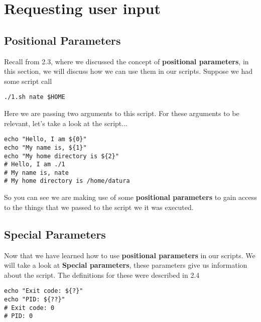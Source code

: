 \documentclass{report}
\begin{document}
  \pagebreak \bigbreak \noindent 
  \section{\LARGE Requesting user input}
  \bigbreak \noindent 
  \subsection{Positional Parameters}
  \bigbreak \noindent 
  Recall from 2.3, where we discussed the concept of \textbf{positional parameters}, in this section, we will discuss how we can use them in our scripts.
  \bigbreak \noindent 
  Suppose we had some script call
  \begin{mdframed}[style=purplebox]
  \begin{verbatim}
./1.sh nate $HOME
  \end{verbatim}
  \bigbreak \noindent
  \end{mdframed}
  \bigbreak \noindent 
  Here we are passing two arguments to this script. For these arguments to be relevant, let's take a look at the script...
  \begin{mdframed}[style=purplebox]
  \begin{verbatim}
echo "Hello, I am ${0}"
echo "My name is, ${1}"
echo "My home directory is ${2}"
# Hello, I am ./1
# My name is, nate
# My home directory is /home/datura
  \end{verbatim}
  \bigbreak \noindent
  \end{mdframed}
  \bigbreak \noindent 
  So you can see we are making use of some \textbf{positional parameters} to gain access to the things that we passed to the script we it was executed.
  \bigbreak \noindent 

  \bigbreak \noindent 
  \subsection{Special Parameters}
  \bigbreak \noindent 
  Now that we have learned how to use \textbf{positional parameters} in our scripts. We will take a look at \textbf{Special parameters}, these parameters give us information about the script. The definitions for these were described in 2.4
  \bigbreak \noindent 
  \begin{mdframed}[style=purplebox]
  \begin{verbatim}
echo "Exit code: ${?}"
echo "PID: ${??}"
# Exit code: 0 
# PID: 0
  \end{verbatim}
  \bigbreak \noindent
  \end{mdframed}
\end{document}
